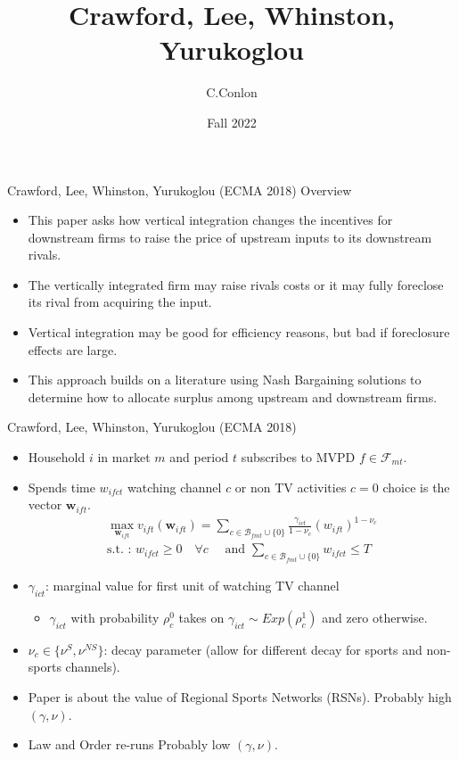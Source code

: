 

\title []{Crawford, Lee, Whinston, Yurukoglou}
\author{C.Conlon }
\date{Fall 2022}


\begin{frame}
\titlepage
\end{frame}




\begin{frame}{Crawford, Lee, Whinston, Yurukoglou (ECMA 2018)}
Overview
\begin{itemize}
\item This paper asks how vertical integration changes the incentives for \alert{downstream firms} to raise the price of upstream inputs to its downstream rivals.
\item The vertically integrated firm may \alert{raise rivals costs} or it may fully \alert{foreclose} its rival from acquiring the input.
\item Vertical integration may be good for efficiency reasons, but bad if foreclosure effects are large.
\item This approach builds on a literature using \alert{Nash Bargaining} solutions to determine how to allocate surplus among upstream and downstream firms.
\end{itemize}
\end{frame}

\begin{frame}{Crawford, Lee, Whinston, Yurukoglou (ECMA 2018)}
\begin{itemize}
\item Household $i$ in market $m$ and period $t$ subscribes to MVPD $f \in \mathcal{F}_{mt}$.
\item Spends time $w_{ifct}$ watching channel $c$ or non TV activities $c=0$ choice is the vector $\mathbf{w}_{ift}$.
\begin{eqnarray*}
\max_{\mathbf{w}_{ift}} v_{ift}(\mathbf{w}_{ift}) =  \sum_{c \in \mathcal{B}_{fmt} \cup \{0\}}  \frac{\gamma_{ict}}{1-\nu_c}(w_{ift})^{1-\nu_c}\\
\mbox{s.t. : } w_{ifct} \geq 0\quad  \forall c \quad \mbox{ and } \sum_{c \in \mathcal{B}_{fmt} \cup \{0\}} w_{ifct} \leq T
\end{eqnarray*}
\item $\gamma_{ict}$: marginal value for first unit of watching TV channel
\begin{itemize}
\item $\gamma_{ict}$ with probability $\rho_c^0$ takes on $\gamma_{ict} \sim Exp(\rho_c^1)$ and zero otherwise.
\end{itemize}
\item $\nu_c \in \{\nu^{S},\nu^{NS}\}$: decay parameter (allow for different decay for sports and non-sports channels).
\item Paper is about the value of \alert{Regional Sports Networks} (RSNs). Probably high $(\gamma,\nu)$.
\item Law and Order re-runs Probably low $(\gamma,\nu)$.
\end{itemize}
\end{frame}


